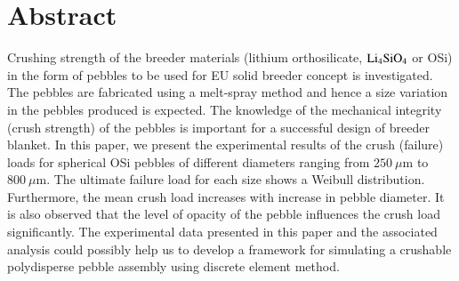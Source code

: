 \section*{Abstract}
Crushing strength of the breeder materials (lithium orthosilicate, $\rm{Li_4SiO_4}$ or OSi) in the form of pebbles to be used for EU solid breeder concept is investigated. The pebbles are fabricated using a melt-spray method and hence a size variation in the pebbles produced is expected. The knowledge of the mechanical integrity (crush strength) of the pebbles is important for a successful design of breeder blanket. In this paper, we present the experimental results of the crush (failure) loads for spherical OSi pebbles of different diameters ranging from $250~\mu$m to $800~\mu$m. The ultimate failure load for each size shows a Weibull distribution. Furthermore, the mean crush load increases with increase in pebble diameter. It is also observed that the level of opacity of the pebble influences the crush load significantly. The experimental data presented in this paper and the associated analysis could possibly help us to develop a framework for simulating a crushable polydisperse pebble assembly using discrete element method. 

